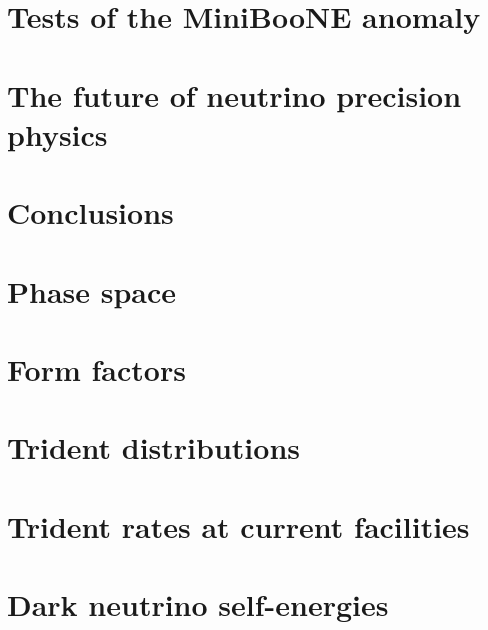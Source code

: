 \documentclass[openany,twoside,frontopenright,chaprunninghead]{ip3thesis}
\begin{document}
\chapter{Tests of the MiniBooNE anomaly}


\chapter{The future of neutrino precision physics}
%

\chapter{Conclusions}


\appendixpageoff
\begin{appendices}
\let\clearpage\relax
\chapter{Phase space}\label{app:phase_space}


\chapter{Form factors}\label{app:form_factors}


\chapter{Trident distributions}\label{app:trident_distributions}


\chapter{Trident rates at current facilities}\label{app:rates_other}


\chapter{Dark neutrino self-energies}\label{app:loop_masses}

\end{appendices}



\end{document}

